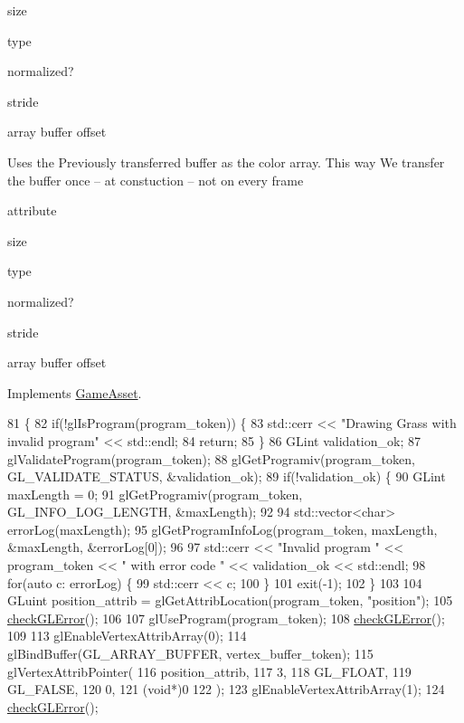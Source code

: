 size

type

normalized?

stride

array buffer offset

Uses the Previously transferred buffer as the color array. This way We transfer the buffer once -- at constuction -- not on every frame

attribute

size

type

normalized?

stride

array buffer offset 

Implements \hyperlink{classGameAsset_a961aa51ca0a9961fc584c0b5d5431300}{Game\+Asset}.


\begin{DoxyCode}
81                                           \{
82   \textcolor{keywordflow}{if}(!glIsProgram(program\_token)) \{
83     std::cerr << \textcolor{stringliteral}{"Drawing Grass with invalid program"} << std::endl;
84     \textcolor{keywordflow}{return};
85   \}
86   GLint validation\_ok;
87   glValidateProgram(program\_token);
88   glGetProgramiv(program\_token, GL\_VALIDATE\_STATUS, &validation\_ok);
89   \textcolor{keywordflow}{if}(!validation\_ok) \{
90     GLint maxLength = 0;
91     glGetProgramiv(program\_token, GL\_INFO\_LOG\_LENGTH, &maxLength);
92 
94     std::vector<char> errorLog(maxLength);
95     glGetProgramInfoLog(program\_token, maxLength, &maxLength, &errorLog[0]);
96 
97     std::cerr << \textcolor{stringliteral}{"Invalid program "} << program\_token << \textcolor{stringliteral}{" with error code "} << validation\_ok << std::endl;
98     \textcolor{keywordflow}{for}(\textcolor{keyword}{auto} c: errorLog) \{
99       std::cerr << c;
100     \}
101     exit(-1);
102   \}
103 
104   GLuint position\_attrib = glGetAttribLocation(program\_token, \textcolor{stringliteral}{"position"});
105   \hyperlink{GrassAsset_8cc_a75f201b0e53e68726854997957322b8d}{checkGLError}();
106 
107   glUseProgram(program\_token);
108   \hyperlink{GrassAsset_8cc_a75f201b0e53e68726854997957322b8d}{checkGLError}();
109 
113   glEnableVertexAttribArray(0);
114   glBindBuffer(GL\_ARRAY\_BUFFER, vertex\_buffer\_token);
115   glVertexAttribPointer(
116     position\_attrib,        
117     3,        
118     GL\_FLOAT,   
119     GL\_FALSE,   
120     0,        
121     (\textcolor{keywordtype}{void}*)0    
122   );
123   glEnableVertexAttribArray(1);
124   \hyperlink{GrassAsset_8cc_a75f201b0e53e68726854997957322b8d}{checkGLError}();

\end{DoxyCode}
